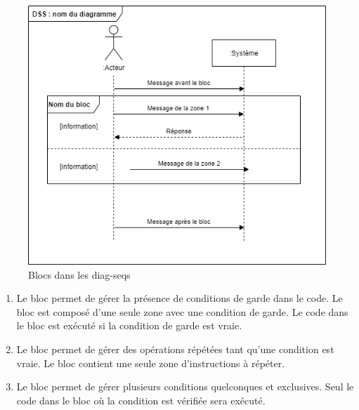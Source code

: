\begin{figure}[H]
	\caption{Blocs dans les \glspl{diag-seq}}
	\centering
	\includegraphics[scale=0.6]{dss-blocs.png}
\end{figure}

\begin{enumerate}
	\item Le bloc  permet de gérer la présence de conditions de garde  dans le code. Le bloc est composé d'une seule zone avec une condition de garde. Le code dans le bloc est exécuté si la condition de garde est vraie.
	\item Le bloc  permet de gérer des opérations répétées tant qu'une condition est vraie. Le bloc contient une seule zone d'instructions à répéter.
	\item Le bloc  permet de gérer plusieurs conditions quelconques et exclusives. Seul le code dans le bloc où la condition est vérifiée sera exécuté.
\end{enumerate}

